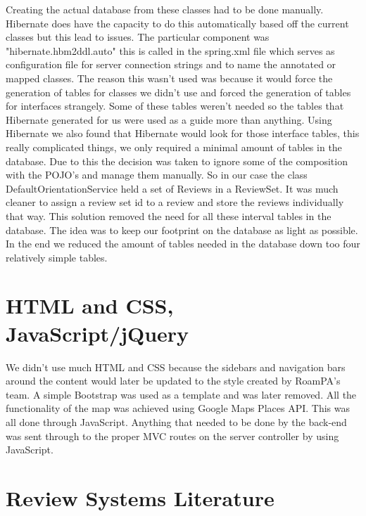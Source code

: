 Creating the actual database from these classes had to be done manually. Hibernate does have the capacity to do this automatically based off the current classes but this lead to issues. The particular component was "hibernate.hbm2ddl.auto" this is called in the spring.xml file which serves as configuration file for server connection strings and to name the annotated or mapped classes. The reason this wasn't used was because it would force the generation of tables for classes we didn't use and forced the generation of tables for interfaces strangely. Some of these tables weren't needed so the tables that Hibernate generated for us were used as a guide more than anything. Using Hibernate we also found that Hibernate would look for those interface tables, this really complicated things, we only required a minimal amount of tables in the database. Due to this the decision was taken to ignore some of the composition with the POJO's and manage them manually. So in our case the class DefaultOrientationService held a set of Reviews in a ReviewSet. It was much cleaner to assign a review set id to a review and store the reviews individually that way. This solution removed the need for all these interval tables in the database. The idea was to keep our footprint on the database as light as possible. In the end we reduced the amount of tables needed in the database down too four relatively simple tables.

\section{HTML and CSS, JavaScript/jQuery}

We didn't use much HTML\cite{HTML} and CSS\cite{CSS} because the sidebars and navigation bars around the content would later be updated to the style created by RoamPA's team. A simple Bootstrap\cite{Bootstrap} was used as a template and was later removed. All the functionality of the map was achieved using Google Maps Places API\cite{GoogleMaps}. This was all done through JavaScript\cite{ECMAS}. Anything that needed to be done by the back-end was sent through to the proper MVC routes on the server controller by using JavaScript.

\section{Review Systems Literature}

